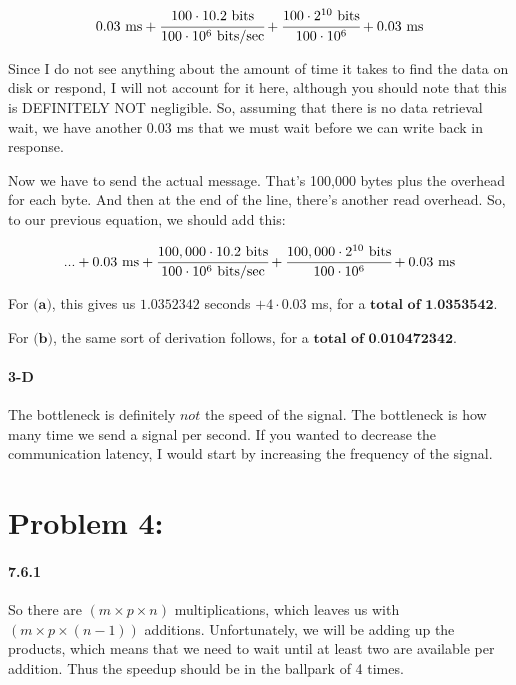 \documentclass[a4paper]{article}
\begin{document}
\begin{equation}
0.03 \mbox{ ms} + \cfrac{100 \cdot 10.2 \mbox{ bits}}{100 \cdot 10^6 \mbox{ bits/sec}} + \cfrac{100 \cdot 2^{10} \mbox{ bits}}{100 \cdot 10^6} + 0.03 \mbox{ ms}
\end{equation}

Since I do not see anything about the amount of time it takes to find the data on disk or respond, I will not account for it here, although you should note that this is DEFINITELY NOT negligible. So, assuming that there is no data retrieval wait, we have another 0.03 ms that we must wait before we can write back in response.

Now we have to send the actual message. That's 100,000 bytes plus the overhead for each byte. And then at the end of the line, there's another read overhead. So, to our previous equation, we should add this:

\begin{equation}
... + 0.03 \mbox{ ms} + \cfrac{100,000 \cdot 10.2 \mbox{ bits}}{100 \cdot 10^6 \mbox{ bits/sec}} + \cfrac{100,000 \cdot 2^{10} \mbox{ bits}}{100 \cdot 10^6} + 0.03 \mbox{ ms}
\end{equation}

For $\textbf{(a)}$, this gives us $1.0352342$ seconds $+ 4 \cdot 0.03$ ms, for a $\textbf{total of 1.0353542}$.

For $\textbf{(b)}$, the same sort of derivation follows, for a $\textbf{total of 0.010472342}$.

\paragraph{3-D} The bottleneck is definitely $\textit{not}$ the speed of the signal. The bottleneck is how many time we send a signal per second. If you wanted to decrease the communication latency, I would start by increasing the frequency of the signal.

\section*{Problem 4:}

\paragraph{7.6.1} So there are $(m \times p \times n)$ multiplications, which leaves us with $(m \times p \times (n-1))$ additions. Unfortunately, we will be adding up the products, which means that we need to wait until at least two are available per addition. Thus the speedup should be in the ballpark of 4 times.
\end{document}
